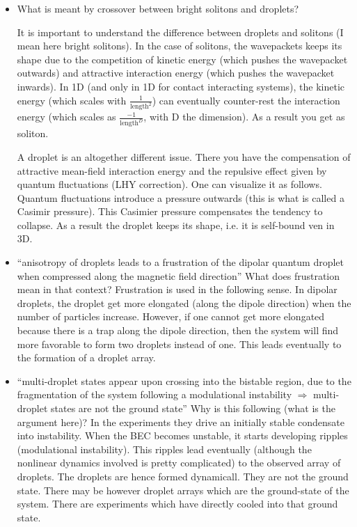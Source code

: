 \begin{itemize}
    \item What is meant by crossover between bright solitons and droplets?
    {\color{red}
        It is important to understand the difference between droplets and solitons (I mean here bright solitons).
        In the case of solitons, the wavepackets keeps its shape due to the competition of kinetic energy
        (which pushes the wavepacket outwards) and attractive interaction energy (which pushes the wavepacket inwards).
        In 1D (and only in 1D for contact interacting systems), the kinetic energy
        (which scales with $\frac{1}{\mathrm{length}^2}$) can eventually counter-rest the interaction energy
        (which scales as $\frac{-1}{\mathrm{length}^D}$, with D the dimension). As a result you get as soliton.

        A droplet is an altogether different issue.
        There you have the compensation of attractive mean-field interaction energy and the repulsive effect given
        by quantum fluctuations (LHY correction). One can visualize it as follows.
        Quantum fluctuations introduce a pressure outwards (this is what is called a Casimir pressure).
        This Casimier pressure compensates the tendency to collapse. As a result the droplet keeps its shape,
        i.e. it is self-bound ven in 3D.
    }

    \item ``anisotropy of droplets leads to a frustration of the dipolar quantum droplet when
        compressed along the magnetic field direction'' What does frustration mean in that context?
    {\color{red}
        Frustration is used in the following sense. In dipolar droplets, the droplet get more elongated
        (along the dipole direction) when the number of particles increase.
        However, if one cannot get more elongated because there is a trap along the dipole direction,
        then the system will find more favorable to form two droplets instead of one.
        This leads eventually to the formation of a droplet array.
    }

    \item ``multi-droplet states appear upon crossing into the bistable region,
        due to the fragmentation of the system following a modulational instability
        $\Rightarrow$ multi-droplet states are not the ground state'' Why is this following (what is the argument here)?
    {\color{red}
        In the experiments they drive an initially stable condensate into instability.
        When the BEC becomes unstable, it starts developing ripples (modulational instability).
        This ripples lead eventually (although the nonlinear dynamics involved is pretty complicated)
        to the observed array of droplets. The droplets are hence formed dynamicall. They are not the ground state.
        There may be however droplet arrays which are the ground-state of the system.
        There are experiments which have directly cooled into that ground state.
    }


\end{itemize}
